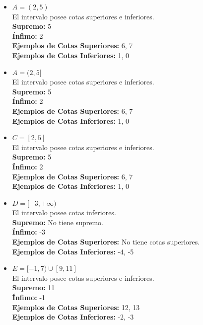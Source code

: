 \documentclass[12pt]{article}
\begin{document}
\begin{itemize}
     \item $A=(2, 5)$ \\
    El intervalo posee cotas superiores e inferiores. \\
    \textbf{Supremo:} 5 \\
    \textbf{Ínfimo:} 2 \\
    \textbf{Ejemplos de Cotas Superiores:} 6, 7 \\
    \textbf{Ejemplos de Cotas Inferiores:} 1, 0 \\

    \item $A=(2, 5]$ \\
    El intervalo posee cotas superiores e inferiores. \\
    \textbf{Supremo:} 5 \\
    \textbf{Ínfimo:} 2 \\
    \textbf{Ejemplos de Cotas Superiores:} 6, 7 \\
    \textbf{Ejemplos de Cotas Inferiores:} 1, 0 \\

    \item $C=[2, 5]$ \\
    El intervalo posee cotas superiores e inferiores. \\
    \textbf{Supremo:} 5 \\
    \textbf{Ínfimo:} 2 \\
    \textbf{Ejemplos de Cotas Superiores:} 6, 7 \\
    \textbf{Ejemplos de Cotas Inferiores:} 1, 0 \\

    \item $D=[-3, +\infty)$ \\
    El intervalo posee cotas inferiores. \\
    \textbf{Supremo:} No tiene supremo. \\
    \textbf{Ínfimo:} -3 \\
    \textbf{Ejemplos de Cotas Superiores:} No tiene cotas superiores. \\
    \textbf{Ejemplos de Cotas Inferiores:} -4, -5 \\

    \item $E=[-1, 7) \cup   [9, 11] $ \\
    El intervalo posee cotas superiores e inferiores. \\
    \textbf{Supremo:} 11 \\
    \textbf{Ínfimo:} -1 \\
    \textbf{Ejemplos de Cotas Superiores:} 12, 13 \\
    \textbf{Ejemplos de Cotas Inferiores:} -2, -3 \\


\end{itemize}
\end{document}
